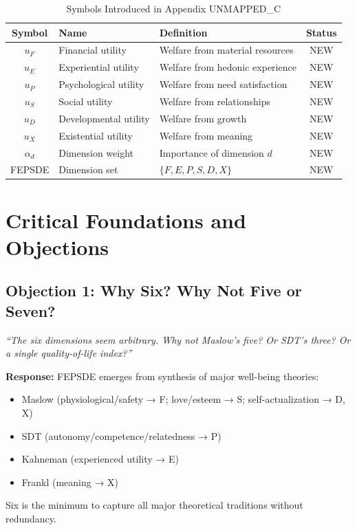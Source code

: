 \begin{table}[htbp]
\centering
\caption{Symbols Introduced in Appendix UNMAPPED_C}
\label{tab:what-symbols}
\renewcommand{\arraystretch}{1.3}
\begin{tabular}{@{}clp{5.5cm}c@{}}
\toprule
\textbf{Symbol} & \textbf{Name} & \textbf{Definition} & \textbf{Status} \\
\midrule
$u_F$ & Financial utility & Welfare from material resources & NEW \\
$u_E$ & Experiential utility & Welfare from hedonic experience & NEW \\
$u_P$ & Psychological utility & Welfare from need satisfaction & NEW \\
$u_S$ & Social utility & Welfare from relationships & NEW \\
$u_D$ & Developmental utility & Welfare from growth & NEW \\
$u_X$ & Existential utility & Welfare from meaning & NEW \\
$\alpha_d$ & Dimension weight & Importance of dimension $d$ & NEW \\
FEPSDE & Dimension set & $\{F, E, P, S, D, X\}$ & NEW \\
\bottomrule
\end{tabular}
\end{table}


\section{Critical Foundations and Objections}
\label{sec:what-critical}

\subsection{Objection 1: Why Six? Why Not Five or Seven?}

\begin{tcolorbox}[colback=red!5!white, colframe=red!50!black,
    title=Objection: Arbitrary Dimensionality]
\textit{``The six dimensions seem arbitrary. Why not Maslow's five? Or SDT's three?
Or a single quality-of-life index?''}
\end{tcolorbox}

\textbf{Response:}
FEPSDE emerges from synthesis of major well-being theories:
\begin{itemize}
\item Maslow (physiological/safety → F; love/esteem → S; self-actualization → D, X)
\item SDT (autonomy/competence/relatedness → P)
\item Kahneman (experienced utility → E)
\item Frankl (meaning → X)
\end{itemize}
Six is the minimum to capture all major theoretical traditions without redundancy.

